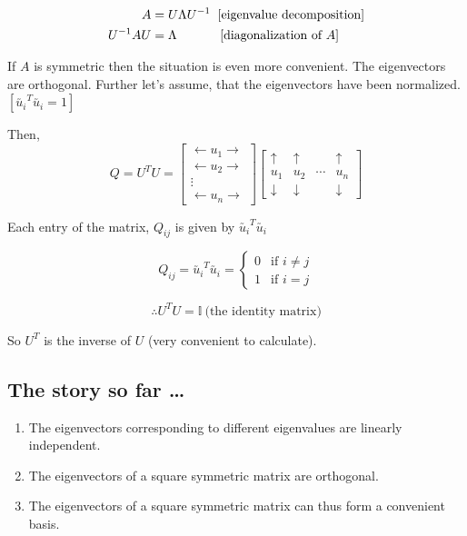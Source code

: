 \documentclass[11pt, a4paper]{article}
\begin{document}
\begin{align*}
A &= U \Lambda U^{-1} \hspace{0.2cm} \text{[eigenvalue decomposition]} \\
U^{-1} A U &= \Lambda \hspace{1.2cm} \text{[diagonalization of } A]
\end{align*}

\newpage

If $A$ is symmetric then the situation is even more convenient. The eigenvectors are orthogonal. Further let's assume, that the eigenvectors have been normalized. $\left[ \utilde{u_i}^T \utilde{u_i} = 1 \right]$

Then,
\[
Q = U^T U =
\begin{bmatrix}
\leftarrow u_1 \rightarrow \\
\leftarrow u_2 \rightarrow \\
\vdots \\
\leftarrow u_n \rightarrow
\end{bmatrix}
\begin{bmatrix}
\uparrow & \uparrow & & \uparrow \\
u_1 & u_2 & \cdots & u_n \\
\downarrow & \downarrow & & \downarrow
\end{bmatrix}
\]

Each entry of the matrix, $Q_{ij}$ is given by $\utilde{u_i}^T \utilde{u_i}$

\[
Q_{ij} = \utilde{u_i}^T \utilde{u_i} =
\begin{cases}
0 & \text{if } i \neq j \\
1 & \text{if } i = j
\end{cases}
\]

\[
\therefore U^T U = \mathbb{I} \ \text{(the identity matrix)}
\]

So $U^T$ is the inverse of $U$ (very convenient to calculate).

\subsection{The story so far \ldots}

\begin{enumerate}[$\bullet$]

\item The eigenvectors corresponding to different eigenvalues are linearly independent.

\item The eigenvectors of a square symmetric matrix are orthogonal.

\item The eigenvectors of a square symmetric matrix can thus form a convenient basis.

\end{enumerate}
\end{document}
